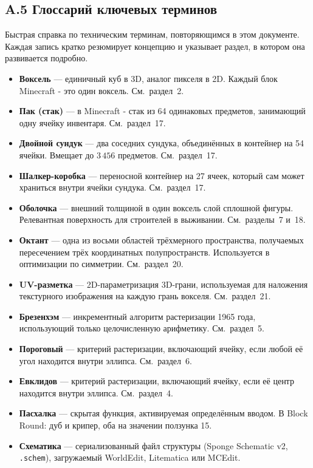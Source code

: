 \documentclass[12pt,a4paper]{scrartcl}
\newcommand{\code}[1]{\texttt{\small #1}}
\begin{document}
\subsection*{A.5 Глоссарий ключевых терминов}

Быстрая справка по техническим терминам, повторяющимся в этом документе. Каждая запись кратко резюмирует концепцию и указывает раздел, в котором она развивается подробно.

\begin{itemize}[leftmargin=1.4em,itemsep=0.18em,topsep=0.3em]
  \item \textbf{Воксель} --- единичный куб в 3D, аналог пикселя в 2D. Каждый блок Minecraft - это один воксель. См.\ раздел~2.
  \item \textbf{Пак (стак)} --- в Minecraft - стак из 64 одинаковых предметов, занимающий одну ячейку инвентаря. См.\ раздел~17.
  \item \textbf{Двойной сундук} --- два соседних сундука, объединённых в контейнер на 54 ячейки. Вмещает до $3\,456$ предметов. См.\ раздел~17.
  \item \textbf{Шалкер-коробка} --- переносной контейнер на 27 ячеек, который сам может храниться внутри ячейки сундука. См.\ раздел~17.
  \item \textbf{Оболочка} --- внешний толщиной в один воксель слой сплошной фигуры. Релевантная поверхность для строителей в выживании. См.\ разделы~7 и~18.
  \item \textbf{Октант} --- одна из восьми областей трёхмерного пространства, получаемых пересечением трёх координатных полупространств. Используется в оптимизации по симметрии. См.\ раздел~20.
  \item \textbf{UV-разметка} --- 2D-параметризация 3D-грани, используемая для наложения текстурного изображения на каждую грань вокселя. См.\ раздел~21.
  \item \textbf{Брезенхэм} --- инкрементный алгоритм растеризации 1965 года, использующий только целочисленную арифметику. См.\ раздел~5.
  \item \textbf{Пороговый} --- критерий растеризации, включающий ячейку, если любой её угол находится внутри эллипса. См.\ раздел~6.
  \item \textbf{Евклидов} --- критерий растеризации, включающий ячейку, если её центр находится внутри эллипса. См.\ раздел~4.
  \item \textbf{Пасхалка} --- скрытая функция, активируемая определённым вводом. В Block Round: дуб и крипер, оба на значении ползунка 15.
  \item \textbf{Схематика} --- сериализованный файл структуры (Sponge Schematic v2, \code{.schem}), загружаемый WorldEdit, Litematica или MCEdit.
\end{itemize}
\end{document}
